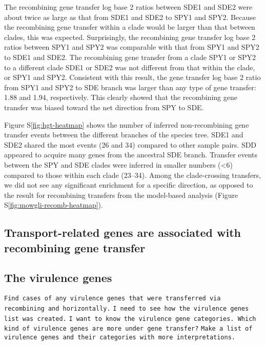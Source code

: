 \documentclass[english]{article}
\begin{document}
The recombining gene transfer log base 2 ratios between SDE1 and SDE2 were about
twice as large as that from SDE1 and SDE2 to SPY1 and SPY2. Because the
recombining gene transfer within a clade would be larger than that between
clades, this was expected. Surprisingly, the recombining gene transfer log base
2 ratios between SPY1 and SPY2 was comparable with that from SPY1 and SPY2 to
SDE1 and SDE2.  The recombining gene transfer from a clade SPY1 or SPY2 to a
different clade SDE1 or SDE2 was not different from that within the clade, or
SPY1 and SPY2.  Consistent with this result, the gene transfer log base 2 ratio
from SPY1 and SPY2 to SDE branch was larger than any type of gene transfer: 1.88
and 1.94, respectively. This clearly showed that the recombining gene transfer
was biased toward the net direction from SPY to SDE.


Figure S\ref{fig:hgt-heatmap} shows the number of inferred
non-recombining gene transfer events between the different branches of
the species tree.
SDE1 and SDE2 shared the most events (26 and 34) compared to other sample pairs. 
SDD appeared to acquire many genes from the ancestral SDE branch. Transfer 
events between the SPY and SDE clades were inferred in smaller numbers (<6) 
compared to those within each clade (23--34). Among the clade-crossing 
transfers, we did not see any significant enrichment for a specific direction, 
as opposed to the result for recombining transfers from the model-based 
analysis (Figure S\ref{fig:mowgli-recomb-heatmap}).

\subsection{Transport-related genes are associated with recombining gene
transfer}

\subsection{The virulence genes}
\texttt{Find cases of any virulence genes that were transferred via recombining and
horizontally.} 
\texttt{I need to see how the virulence genes list was created.}
\texttt{I want to know the virulence gene categories. Which kind of virulence
genes are more under gene transfer?}
\texttt{Make a list of virulence genes and their categories with more
interpretations.}
\end{document}
